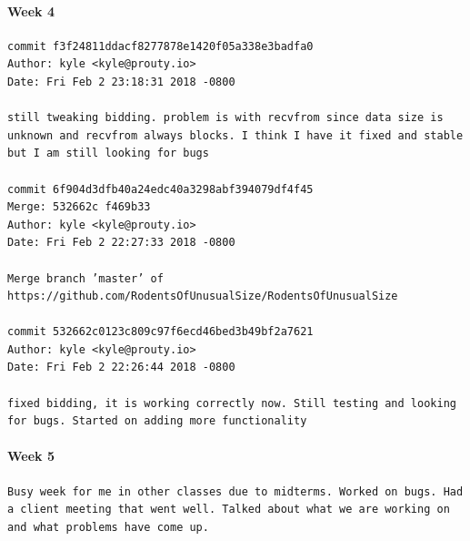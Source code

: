 \documentclass[draftclsnofoot, onecolumn, compsoc, 10pt]{IEEEtran}
\begin{document}
\paragraph{Week 4}
\begin{lstlisting}
commit f3f24811ddacf8277878e1420f05a338e3badfa0 
Author: kyle <kyle@prouty.io> 
Date: Fri Feb 2 23:18:31 2018 -0800 

still tweaking bidding. problem is with recvfrom since data size is unknown and recvfrom always blocks. I think I have it fixed and stable but I am still looking for bugs 

commit 6f904d3dfb40a24edc40a3298abf394079df4f45 
Merge: 532662c f469b33 
Author: kyle <kyle@prouty.io> 
Date: Fri Feb 2 22:27:33 2018 -0800 

Merge branch ’master’ of https://github.com/RodentsOfUnusualSize/RodentsOfUnusualSize 

commit 532662c0123c809c97f6ecd46bed3b49bf2a7621 
Author: kyle <kyle@prouty.io> 
Date: Fri Feb 2 22:26:44 2018 -0800 

fixed bidding, it is working correctly now. Still testing and looking for bugs. Started on adding more functionality 
\end{lstlisting}
\paragraph{Week 5}
\begin{lstlisting}
Busy week for me in other classes due to midterms. Worked on bugs. Had a client meeting that went well. Talked about what we are working on and what problems have come up. 
\end{lstlisting}
\end{document}

